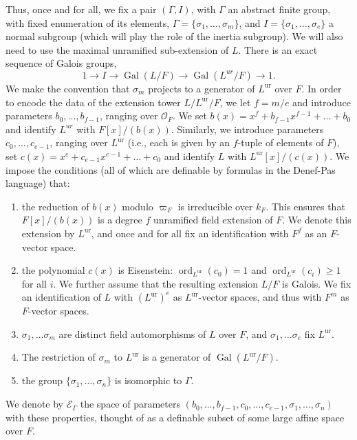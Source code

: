 \documentclass{amsart}
\newcommand{\ri}{\mathcal{O}}
\newcommand{\gal}{\operatorname{Gal}}
\newcommand{\ur}{\mathrm{ur}}
\newcommand\cE{{\mathcal E}}
\DeclareMathOperator{\ord}{ord}
\theoremstyle{plain}
\theoremstyle{definition}
\begin{document}
Thus, once and for all, we fix a pair $(\Gamma,I)$,  with $\Gamma$ an abstract finite group, with fixed enumeration of its elements, $\Gamma=\{\sigma_1, \dots, \sigma_m\}$, and 
$I=\{\sigma_1, \dots, \sigma_e\}$
a normal subgroup (which will play the role of the inertia subgroup). We will also need to use the maximal unramified sub-extension of $L$.
There is an exact sequence of Galois groups, 
$$ 1\to I \to \gal(L/F)\to \gal(L^{ur}/F)\to 1.$$
We 
make the convention that $\sigma_m$ projects to a generator of $L^{\ur}$ over $F$. 
In order to encode the data of the extension tower $L/L^{\ur}/F$, we let $f=m/e$ and introduce parameters $b_0,\dots, b_{f-1}$, ranging over $\ri_F$.
We set $b(x)=x^f+b_{f-1}x^{f-1}+ \dots + b_0$ and identify $L^{ur}$ with $F[x]/(b(x))$. 
Similarly, we introduce parameters $c_0, \dots, c_{e-1}$, ranging over $L^{\ur}$
(i.e., each is given by an $f$-tuple of elements of $F$), set $c(x) = x^e + c_{e-1}x^{e-1} + \dots + c_0$ and identify $L$ with $L^{\ur}[x]/(c(x))$. 
We impose the conditions (all of which are definable by formulas in the Denef-Pas language) that: 
\begin{enumerate}
\item the reduction of $b(x)$ modulo $\varpi_F$ is irreducible over $k_F$. 
This ensures that $F[x]/(b(x))$ is a degree $f$ unramified field extension of $F$. 
We denote this extension by $L^\ur$, and once and for all fix an identification with $F^f$ as 
an $F$-vector space. 
\item the polynomial $c(x)$ is Eisenstein: $\ord_{L^{\ur}}(c_0) = 1$ and $\ord_{L^{\ur}}(c_i) \ge 1$ for all $i$.
We further assume that the resulting extension $L/F$ is Galois.
We fix an identification of $L$ with $(L^\ur)^e$ as $L^\ur$-vector spaces, and thus with $F^m$ as $F$-vector spaces. 
\item $\sigma_1, \dots \sigma_m$ are distinct field automorphisms of $L$ over $F$, and 
 $\sigma_1, \dots \sigma_e$ fix $L^\ur$.
\item The restriction of $\sigma_m$ to $L^\ur$ is a generator of $\gal(L^\ur/F)$. 
\item the group $\{\sigma_1, \dots, \sigma_n\}$ is isomorphic to $\Gamma$.
\end{enumerate}
We denote by $\cE_\Gamma$ the space of parameters $(b_0, \dots, b_{f-1}, c_0, \dots, c_{e-1}, \sigma_1, \dots, \sigma_n)$ with these properties, thought of as a definable subset of some large affine space over $F$. 
\end{document}
